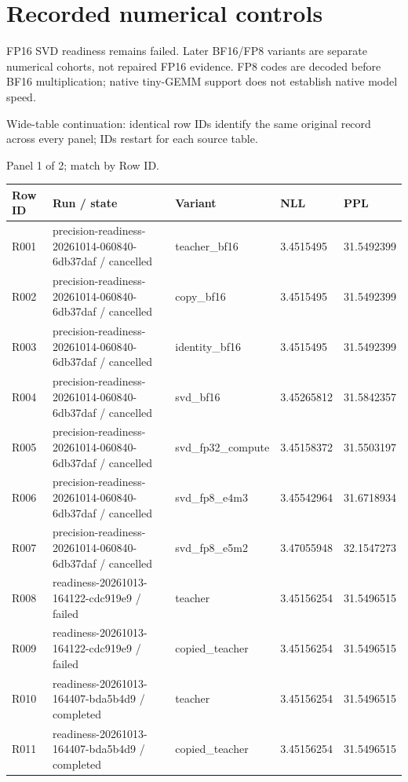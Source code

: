 \documentclass[10pt]{article}
\begin{document}
\section{Recorded numerical controls}

FP16 SVD readiness remains failed. Later BF16/FP8 variants are separate numerical cohorts, not repaired FP16 evidence. FP8 codes are decoded before BF16 multiplication; native tiny-GEMM support does not establish native model speed.

Wide-table continuation: identical row IDs identify the same original record across every panel; IDs restart for each source table.
\par\noindent Panel 1 of 2; match by Row ID.
{\scriptsize\setlength{\tabcolsep}{2pt}
\begin{longtable}{p{}p{}p{}p{}p{}}
Row ID & Run / state & Variant & NLL & PPL \\
\hline\endhead
R001 & precision-readiness-20261014-060840-6db37daf / cancelled & teacher\_bf16 & 3.4515495 & 31.5492399 \\
R002 & precision-readiness-20261014-060840-6db37daf / cancelled & copy\_bf16 & 3.4515495 & 31.5492399 \\
R003 & precision-readiness-20261014-060840-6db37daf / cancelled & identity\_bf16 & 3.4515495 & 31.5492399 \\
R004 & precision-readiness-20261014-060840-6db37daf / cancelled & svd\_bf16 & 3.45265812 & 31.5842357 \\
R005 & precision-readiness-20261014-060840-6db37daf / cancelled & svd\_fp32\_compute & 3.45158372 & 31.5503197 \\
R006 & precision-readiness-20261014-060840-6db37daf / cancelled & svd\_fp8\_e4m3 & 3.45542964 & 31.6718934 \\
R007 & precision-readiness-20261014-060840-6db37daf / cancelled & svd\_fp8\_e5m2 & 3.47055948 & 32.1547273 \\
R008 & readiness-20261013-164122-cdc919e9 / failed & teacher & 3.45156254 & 31.5496515 \\
R009 & readiness-20261013-164122-cdc919e9 / failed & copied\_teacher & 3.45156254 & 31.5496515 \\
R010 & readiness-20261013-164407-bda5b4d9 / completed & teacher & 3.45156254 & 31.5496515 \\
R011 & readiness-20261013-164407-bda5b4d9 / completed & copied\_teacher & 3.45156254 & 31.5496515 \\

\end{longtable}}
\end{document}
